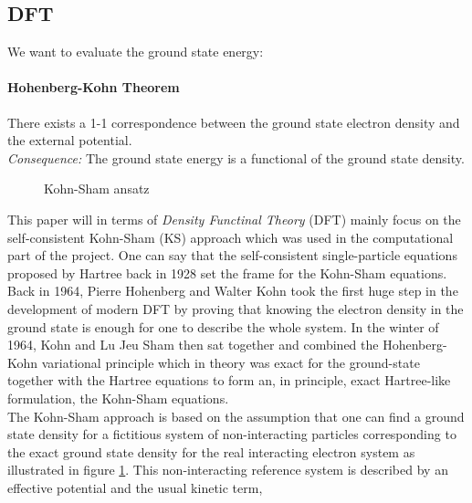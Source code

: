 \subsection{DFT}
We want to evaluate the ground state energy:
\paragraph{Hohenberg-Kohn Theorem} There exists a 1-1 correspondence between the ground state electron density and the external potential.\\
\emph{Consequence:} The ground state energy is a functional of the ground state density.

\begin{figure}[h!]
    \centering
    \caption{Kohn-Sham ansatz}
    \label{fig:dft_ks_ansatz}
\end{figure}
This paper will in terms of \emph{Density Functinal Theory} (DFT) mainly focus on the self-consistent Kohn-Sham (KS) approach which was used in the computational part of the project. One can say that the self-consistent single-particle equations proposed by Hartree back in 1928 set the frame for the Kohn-Sham equations. \\ Back in 1964, Pierre Hohenberg and Walter Kohn took the first huge step in the development of modern DFT by proving that knowing the electron density in the ground state is enough for one to describe the whole system. In the winter of 1964, Kohn and Lu Jeu Sham then sat together and combined the Hohenberg-Kohn variational principle which in theory was exact for the ground-state together with the Hartree equations to form an, in principle, exact Hartree-like formulation, the Kohn-Sham equations.
\cite{KohnNobelLecture} \\
The Kohn-Sham approach is based on the assumption that one can find a ground state density for a fictitious system of non-interacting particles corresponding to the exact ground state density for the real interacting electron system as illustrated in figure \ref{fig:dft_ks_ansatz}. This non-interacting reference system is described by an effective potential and the usual kinetic term,
